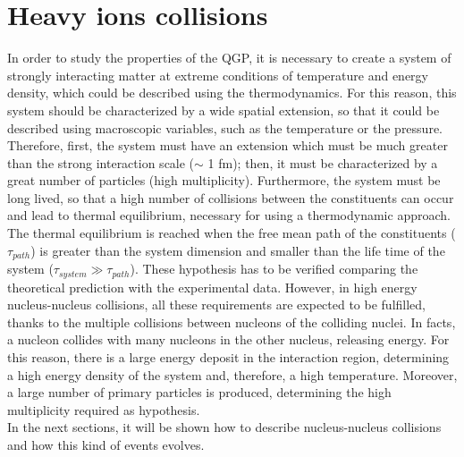 \section{Heavy ions collisions}
In order to study the properties of the QGP, it is necessary to create a system of strongly interacting matter at extreme conditions of temperature and energy density, which could be described using the thermodynamics. For this reason, this system should be characterized by a wide spatial extension, so that it could be described using macroscopic variables, such as the temperature or the pressure. Therefore, first, the system must have an extension which must be much greater than the strong interaction scale ($\sim$ 1 fm); then, it must be characterized by a great number of particles (high multiplicity). Furthermore, the system must be long lived, so that a high number of collisions between the constituents can occur and lead to thermal equilibrium, necessary for using a thermodynamic approach. The thermal equilibrium is reached when the free mean path of the constituents ($\tau_{path}$) is greater than the system dimension and smaller than the life time of the system ($\tau_{system}\gg\tau_{path}$). These hypothesis has to be verified comparing the theoretical prediction with the experimental data. However, in high energy nucleus-nucleus collisions, all these requirements are expected to be fulfilled, thanks to the multiple collisions between nucleons of the colliding nuclei. In facts, a nucleon collides with many nucleons in the other nucleus, releasing energy. For this reason, there is a large energy deposit in the interaction region, determining a high energy density of the system and, therefore, a high temperature. Moreover, a large number of primary particles is produced, determining the high multiplicity required as hypothesis.\\
In the next sections, it will be shown how to describe nucleus-nucleus collisions and how this kind of events evolves.\\

